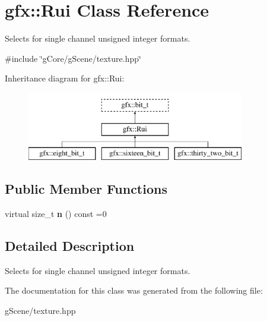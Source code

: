 \hypertarget{classgfx_1_1Rui}{\section{gfx\-:\-:Rui Class Reference}
\label{classgfx_1_1Rui}
}


Selects for single channel unsigned integer formats.  




{\ttfamily \#include \char`\"{}g\-Core/g\-Scene/texture.\-hpp\char`\"{}}

Inheritance diagram for gfx\-:\-:Rui\-:\begin{figure}[H]
\begin{center}
\leavevmode
\includegraphics[height=3.000000cm]{classgfx_1_1Rui}
\end{center}
\end{figure}
\subsection*{Public Member Functions}
\begin{DoxyCompactItemize}
\item 
\hypertarget{classgfx_1_1Rui_a349e5306cdc4abc1c0117ac3a4725440}{virtual size\-\_\-t {\bfseries n} () const =0}\label{classgfx_1_1Rui_a349e5306cdc4abc1c0117ac3a4725440}

\end{DoxyCompactItemize}


\subsection{Detailed Description}
Selects for single channel unsigned integer formats. 

The documentation for this class was generated from the following file\-:\begin{DoxyCompactItemize}
\item 
g\-Scene/texture.\-hpp\end{DoxyCompactItemize}
